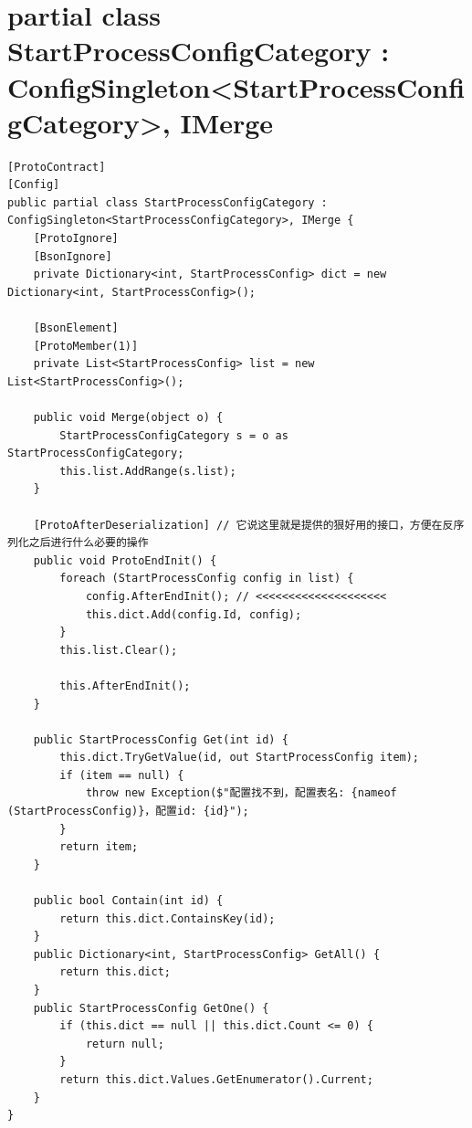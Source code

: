 \documentclass[9pt, b5paper]{article}
\begin{document}
\section{partial class StartProcessConfigCategory : ConfigSingleton<StartProcessConfigCategory>, IMerge}
\label{sec-19}
\begin{verbatim}
[ProtoContract]
[Config]
public partial class StartProcessConfigCategory : ConfigSingleton<StartProcessConfigCategory>, IMerge {
    [ProtoIgnore]
    [BsonIgnore]
    private Dictionary<int, StartProcessConfig> dict = new Dictionary<int, StartProcessConfig>();

    [BsonElement]
    [ProtoMember(1)]
    private List<StartProcessConfig> list = new List<StartProcessConfig>();

    public void Merge(object o) {
        StartProcessConfigCategory s = o as StartProcessConfigCategory;
        this.list.AddRange(s.list);
    }

    [ProtoAfterDeserialization] // 它说这里就是提供的狠好用的接口，方便在反序列化之后进行什么必要的操作       
    public void ProtoEndInit() {
        foreach (StartProcessConfig config in list) {
            config.AfterEndInit(); // <<<<<<<<<<<<<<<<<<<< 
            this.dict.Add(config.Id, config);
        }
        this.list.Clear();

        this.AfterEndInit();
    }

    public StartProcessConfig Get(int id) {
        this.dict.TryGetValue(id, out StartProcessConfig item);
        if (item == null) {
            throw new Exception($"配置找不到，配置表名: {nameof (StartProcessConfig)}，配置id: {id}");
        }
        return item;
    }

    public bool Contain(int id) {
        return this.dict.ContainsKey(id);
    }
    public Dictionary<int, StartProcessConfig> GetAll() {
        return this.dict;
    }
    public StartProcessConfig GetOne() {
        if (this.dict == null || this.dict.Count <= 0) {
            return null;
        }
        return this.dict.Values.GetEnumerator().Current;
    }
}
\end{verbatim}
\end{document}
